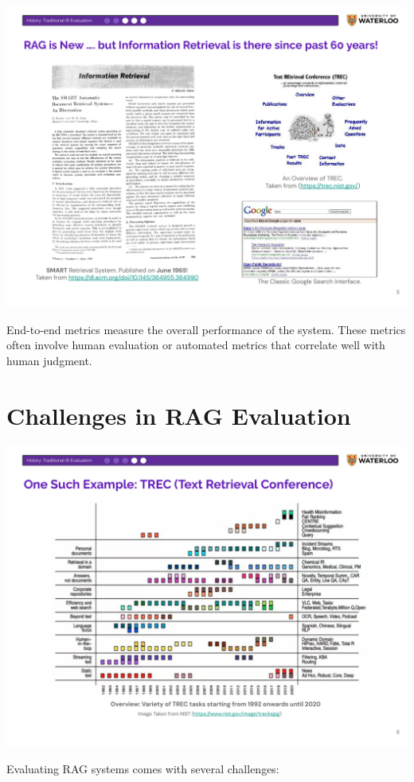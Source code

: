 \documentclass[
  letterpaper,
  oneside]{scrbook}
\begin{document}
\includegraphics{chapters/../p2-images/slide_5.png}

End-to-end metrics measure the overall performance of the system. These
metrics often involve human evaluation or automated metrics that
correlate well with human judgment.

\section{Challenges in RAG
Evaluation}\label{challenges-in-rag-evaluation}

\includegraphics{chapters/../p2-images/slide_6.png}

Evaluating RAG systems comes with several challenges:
\end{document}
